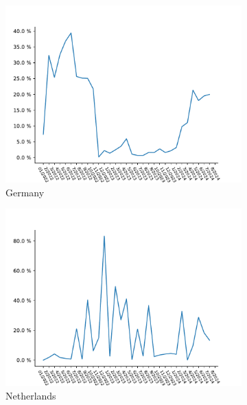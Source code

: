 \begin{figure}
	\centering
	\begin{subfigure}[t]{0.47\linewidth}
		\includegraphics[width=\linewidth]{./chapters/4-results/packet-loss/img/DE.pdf}
		\caption{Germany}
	\end{subfigure}
	\begin{subfigure}[t]{0.47\linewidth}
		\includegraphics[width=\linewidth]{./chapters/4-results/packet-loss/img/NL.pdf}
		\caption{Netherlands}
	\end{subfigure}
	\begin{subfigure}[t]{0.47\linewidth}

\end{subfigure}
\end{figure}
